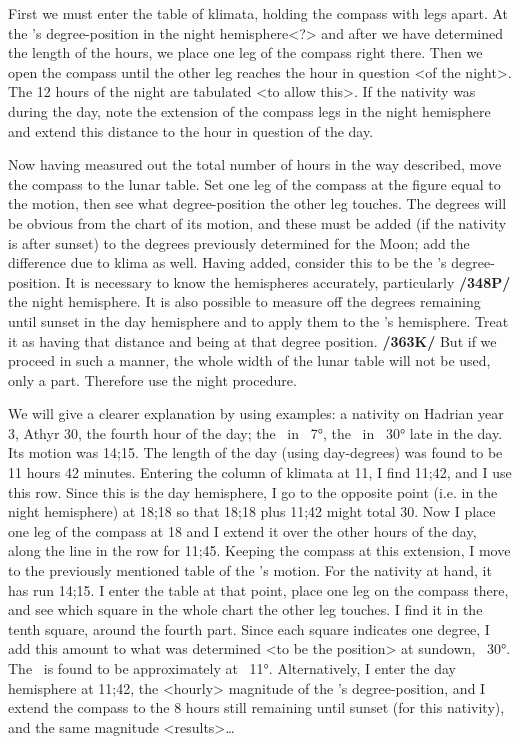 First we must enter the table of klimata, holding the compass with legs apart. At the \Sun’s degree-position in the night hemisphere<?> and after we have determined the length of the hours, we place one leg of the compass right there. Then we open the compass until the other leg reaches the hour in question <of the night>. The 12 hours of the night are tabulated <to allow this>. If the nativity was during the day, note the extension of the compass legs in the night hemisphere and extend this distance to the hour in question of the day.

Now having measured out the total number of hours in the way described, move the compass to the lunar table. Set one leg of the compass at the figure equal to the motion, then see what degree-position the other leg touches. The degrees will be obvious from the chart of its motion, and these must be added (if the nativity is after sunset) to the degrees previously determined for the Moon; add the difference due to klima as well. Having added, consider this to be the \Moon’s degree-position. It is necessary to know the hemispheres accurately, particularly \textbf{/348P/} the night hemisphere. It is also possible to measure off the degrees remaining until sunset in the day hemisphere and to apply them to the \Moon’s hemisphere. Treat it as having that distance and being at that degree position. \textbf{/363K/} But if we proceed in such a manner, the whole width of the lunar table will not be used, only a part. Therefore use the night procedure.

We will give a clearer explanation by using examples: a nativity on Hadrian year 3, Athyr 30, the fourth hour of the day; the \Sun\, in \Scorpio\, 7°, the \Moon\, in \Virgo\, 30° late in the day. Its motion was 14;15. The length of the day (using day-degrees) was found to be 11 hours 42 minutes. Entering the column of klimata at 11, I find 11;42, and I use this row. Since this is the day hemisphere, I go to the opposite point (i.e. in the night hemisphere) at 18;18 so that 18;18 plus 11;42 might total 30. Now I place one leg of the compass at 18 and I extend it over the other hours of the day, along the line in the row for 11;45. Keeping the compass at this extension, I move to the previously mentioned table of the \Moon’s motion. For the nativity at hand, it has run 14;15. I enter the table at that point, place one leg on the compass there, and see which square in the whole chart the other leg touches. I find it in the tenth square, around the fourth part. Since each square indicates one degree, I add this amount to what was determined <to be the position> at sundown, \Virgo\, 30°. The \Moon\, is found to be approximately at \Libra\, 11°. Alternatively, I enter the day hemisphere at 11;42, the <hourly> magnitude of the \Sun’s degree-position, and I extend the compass to the 8 hours still remaining until sunset (for this nativity), and the same magnitude <results>…

\newpage
